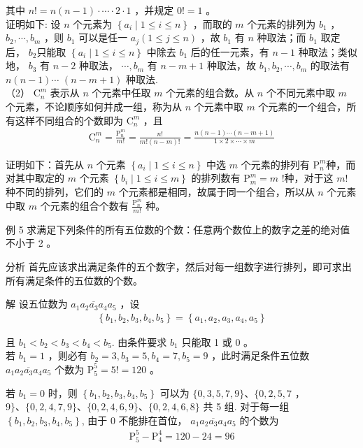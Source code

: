 \documentclass[10pt]{article}
\begin{document}
其中 $n!=n(n-1) \cdot \cdots \cdot 2 \cdot 1$ ，并规定 $0!=1$ 。\\
证明如下: 设 $n$ 个元素为 $\left\{a_{i} \mid 1 \leqslant i \leqslant n\right\}$ ，而取的 $m$ 个元素的排列为 $b_{1}$ ， $b_{2}, \cdots, b_{m}$ ，则 $b_{1}$ 可以是任一 $a_{j}(1 \leqslant j \leqslant n)$ ，故 $b_{1}$ 有 $n$ 种取法；而 $b_{1}$ 取定后， $b_{2}$只能取 $\left\{a_{i} \mid 1 \leqslant i \leqslant n\right\}$ 中除去 $b_{1}$ 后的任一元素，有 $n-1$ 种取法；类似地， $b_{3}$ 有 $n-2$ 种取法， $\cdots, b_{m}$ 有 $n-m+1$ 种取法，故 $b_{1}, b_{2}, \cdots, b_{m}$ 的取法有 $n(n-1) \cdots$ $(n-m+1)$ 种取法.\\
（2） $\mathrm{C}_{n}^{m}$ 表示从 $n$ 个元素中任取 $m$ 个元素的组合数。从 $n$ 个不同元素中取 $m$ 个元素，不论顺序如何并成一组，称为从 $n$ 个元素中取 $m$ 个元素的一个组合，所有这样不同组合的个数即为 $\mathrm{C}_{n}^{m}$ ，且\\
\begin{align*}
\mathrm{C}_{n}^{m}=\frac{\mathrm{P}_{n}^{m}}{m!}=\frac{n!}{m!(n-m)!}=\frac{n(n-1) \cdots(n-m+1)}{1 \times 2 \times \cdots \times m}
\end{align*}

证明如下：首先从 $n$ 个元素 $\left\{a_{i} \mid 1 \leqslant i \leqslant n\right\}$ 中选 $m$ 个元素的排列有 $\mathrm{P}_{n}^{m}$种，而对其中取定的 $m$ 个元素 $\left\{b_{i} \mid 1 \leqslant i \leqslant m\right\}$ 的排列数有 $\mathrm{P}_{m}^{m}=m$ !种，对于这 $m!$ 种不同的排列，它们的 $m$ 个元素都是相同，故属于同一个组合，所以从 $n$ 个元素中取 $m$ 个元素的组合个数有 $\frac{\mathrm{P}_{n}^{m}}{m!}$ 种。

例 5 求满足下列条件的所有五位数的个数：任意两个数位上的数字之差的绝对值不小于 2 。

分析 首先应该求出满足条件的五个数字，然后对每一组数字进行排列，即可求出所有满足条件的五位数的个数。

解 设五位数为 $\overline{a_{1} a_{2} a_{3} a_{4} a_{5}}$ ，设\\
\begin{align*}
\left\{b_{1}, b_{2}, b_{3}, b_{4}, b_{5}\right\}=\left\{a_{1}, a_{2}, a_{3}, a_{4}, a_{5}\right\}
\end{align*}

且 $b_{1}<b_{2}<b_{3}<b_{4}<b_{5}$. 由条件要求 $b_{1}$ 只能取 1 或 0 。\\
若 $b_{1}=1$ ，则必有 $b_{2}=3, b_{3}=5, b_{4}=7, b_{5}=9$ ，此时满足条件五位数 $\overline{a_{1} a_{2} a_{3} a_{4} a_{5}}$ 个数为 $\mathrm{P}_{5}^{5}=5!=120$ 。

若 $b_{1}=0$ 时，则 $\left\{b_{1}, b_{2}, b_{3}, b_{4}, b_{5}\right\}$ 可以为 $\{0,3,5,7,9\} 、\{0,2,5,7$ ， $9\} 、\{0,2,4,7,9\} 、\{0,2,4,6,9\} 、\{0,2,4,6,8\}$ 共 5 组. 对于每一组 $\left\{b_{1}, b_{2}, b_{3}, b_{4}, b_{5}\right\}$, 由于 0 不能排在首位， $\overline{a_{1} a_{2} a_{3} a_{4} a_{5}}$ 的个数为\\
\begin{align*}
\mathrm{P}_{5}^{5}-\mathrm{P}_{4}^{4}=120-24=96
\end{align*}
\end{document}
